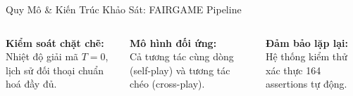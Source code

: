 \documentclass[aspectratio=169,9pt]{beamer}
\begin{document}
\begin{frame}{Quy Mô \& Kiến Trúc Khảo Sát: FAIRGAME Pipeline}
\begin{center}
\begin{tikzpicture}[
  scale=0.9, every node/.style={font=\scriptsize},
  box/.style={draw=mprimary!60, fill=mlight, rounded corners=3pt, align=center, inner sep=5pt}
]
\end{tikzpicture}
\end{center}

\vspace{0.4cm}
\begin{columns}[T]
\begin{primarybox}
\footnotesize \textbf{Kiểm soát chặt chẽ:}\\Nhiệt độ giải mã $T=0$, lịch sử đối thoại chuẩn hoá đầy đủ.
\end{primarybox}

\begin{goodbox}
\footnotesize \textbf{Mô hình đối ứng:}\\Cả tương tác cùng dòng (self-play) và tương tác chéo (cross-play).
\end{goodbox}

\begin{accentbox}
\footnotesize \textbf{Đảm bảo lặp lại:}\\Hệ thống kiểm thử xác thực 164 assertions tự động.
\end{accentbox}
\end{columns}

\end{frame}
\end{document}

